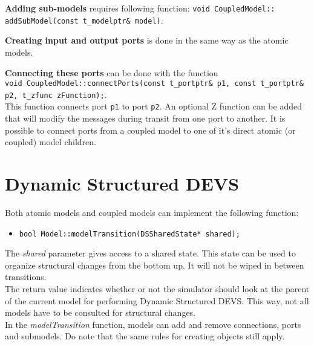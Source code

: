 \textbf{Adding sub-models} requires following function: \texttt{void CoupledModel:: \\addSubModel(const t\_modelptr\& model)}.

\textbf{Creating input and output ports} is done in the same way as the atomic models.

\textbf{Connecting these ports} can be done with the function\\ \texttt{void CoupledModel::connectPorts(const t\_portptr\& p1, const t\_portptr\& p2, t\_zfunc zFunction);}.\\ This function connects port \texttt{p1} to port \texttt{p2}. An optional Z function can be added that will modify the messages during transit from one port to another.
It is possible to connect ports from a coupled model to one of it's direct atomic (or coupled) model children.

\section{Dynamic Structured DEVS}
Both atomic models and coupled models can implement the following function:
\begin{itemize}
	\item \texttt{bool Model::modelTransition(DSSharedState* shared);}
\end{itemize}
The \textsl{shared} parameter gives access to a shared state. This state can be used to organize structural changes from the bottom up. It will not be wiped in between transitions.\\
The return value indicates whether or not the simulator should look at the parent of the current model for performing Dynamic Structured DEVS. This way, not all models have to be consulted for structural changes.\\
In the \textsl{modelTransition} function, models can add and remove connections, ports and submodels. Do note that the same rules for creating objects still apply.
